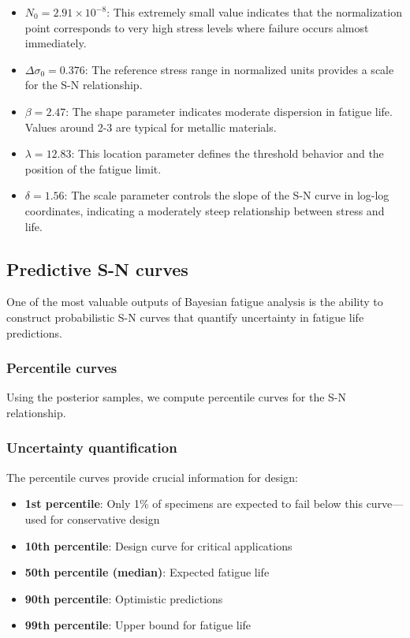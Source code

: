 \begin{itemize}
\item \textbf{$N_0 = 2.91 \times 10^{-8}$}: This extremely small value indicates that the normalization point corresponds to very high stress levels where failure occurs almost immediately.
\item \textbf{$\Delta\sigma_0 = 0.376$}: The reference stress range in normalized units provides a scale for the S-N relationship.
\item \textbf{$\beta = 2.47$}: The shape parameter indicates moderate dispersion in fatigue life. Values around 2-3 are typical for metallic materials.
\item \textbf{$\lambda = 12.83$}: This location parameter defines the threshold behavior and the position of the fatigue limit.
\item \textbf{$\delta = 1.56$}: The scale parameter controls the slope of the S-N curve in log-log coordinates, indicating a moderately steep relationship between stress and life.
\end{itemize}

\subsection{Predictive S-N curves}

One of the most valuable outputs of Bayesian fatigue analysis is the ability to construct probabilistic S-N curves that quantify uncertainty in fatigue life predictions.

\subsubsection*{Percentile curves}

Using the posterior samples, we compute percentile curves for the S-N relationship.

\subsubsection*{Uncertainty quantification}

The percentile curves provide crucial information for design:
\begin{itemize}
\item \textbf{1st percentile}: Only 1\% of specimens are expected to fail below this curve—used for conservative design
\item \textbf{10th percentile}: Design curve for critical applications
\item \textbf{50th percentile (median)}: Expected fatigue life
\item \textbf{90th percentile}: Optimistic predictions
\item \textbf{99th percentile}: Upper bound for fatigue life
\end{itemize}


